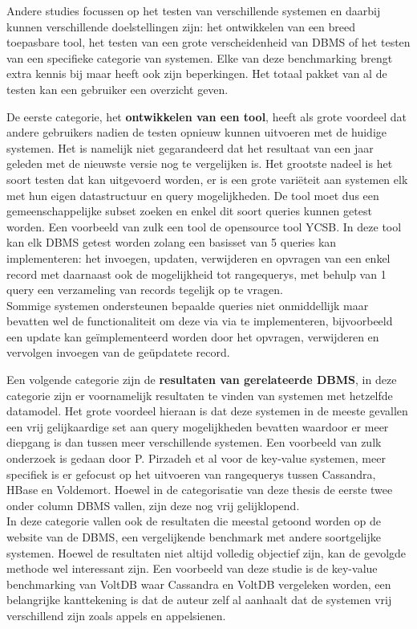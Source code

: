 Andere studies focussen op het testen van verschillende systemen en daarbij kunnen verschillende doelstellingen zijn: het ontwikkelen van een breed toepasbare tool, het testen van een grote verscheidenheid van DBMS of het testen van een specifieke categorie van systemen. Elke van deze benchmarking brengt extra kennis bij maar heeft ook zijn beperkingen. Het totaal pakket van al de testen kan een gebruiker een overzicht geven. 

De eerste categorie, het \textbf{ontwikkelen van een tool}, heeft als grote voordeel dat andere gebruikers nadien de testen opnieuw kunnen uitvoeren met de huidige systemen. Het is namelijk niet gegarandeerd dat het resultaat van een jaar geleden met de nieuwste versie nog te vergelijken is. Het grootste nadeel is het soort testen dat kan uitgevoerd worden, er is een grote variëteit aan systemen elk met hun eigen datastructuur en query mogelijkheden. De tool moet dus een gemeenschappelijke subset zoeken en enkel dit soort queries kunnen getest worden. Een voorbeeld van zulk een tool de opensource tool YCSB\cite{cooper2010benchmarking}. In deze tool kan elk DBMS getest worden zolang een basisset van 5 queries kan implementeren: het invoegen, updaten, verwijderen en opvragen van een enkel record met daarnaast ook de mogelijkheid tot \glspl{rangequery}, met behulp van 1 query een verzameling van records tegelijk op te vragen. \\
Sommige systemen ondersteunen bepaalde queries niet onmiddellijk maar bevatten wel de functionaliteit om deze via via te implementeren, bijvoorbeeld een update kan geïmplementeerd worden door het opvragen, verwijderen en vervolgen invoegen van de geüpdatete record. 

Een volgende categorie zijn de \textbf{resultaten van gerelateerde DBMS}, in deze categorie zijn er voornamelijk resultaten te vinden van systemen met hetzelfde datamodel. Het grote voordeel hieraan is dat deze systemen in de meeste gevallen een vrij gelijkaardige set aan query mogelijkheden bevatten waardoor er meer diepgang is dan tussen meer verschillende systemen. Een voorbeeld van zulk onderzoek is gedaan door P. Pirzadeh et al\cite{pirzadeh2011performance} voor de key-value systemen, meer specifiek is er gefocust op het uitvoeren van \glspl{rangequery} tussen Cassandra, HBase en Voldemort. Hoewel in de categorisatie van deze thesis de eerste twee onder column DBMS vallen, zijn deze nog vrij gelijklopend. \\
In deze categorie vallen ook de resultaten die meestal getoond worden op de website van de DBMS, een vergelijkende benchmark met andere soortgelijke systemen. Hoewel de resultaten niet altijd volledig objectief zijn, kan de gevolgde methode wel interessant zijn. Een voorbeeld van deze studie is de key-value benchmarking van VoltDB\cite{huggkey} waar Cassandra en VoltDB vergeleken worden, een belangrijke kanttekening is dat de auteur zelf al aanhaalt dat de systemen vrij verschillend zijn zoals appels en appelsienen.   

